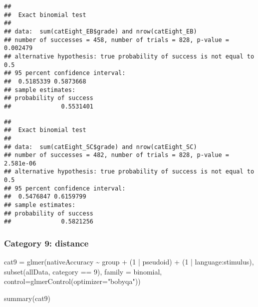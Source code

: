\documentclass[
]{article}
\newenvironment{Shaded}{\begin{snugshade}}{\end{snugshade}}
\newcommand{\AttributeTok}[1]{\textcolor[rgb]{0.77,0.63,0.00}{#1}}
\newcommand{\DecValTok}[1]{\textcolor[rgb]{0.00,0.00,0.81}{#1}}
\newcommand{\FunctionTok}[1]{\textcolor[rgb]{0.00,0.00,0.00}{#1}}
\newcommand{\NormalTok}[1]{#1}
\newcommand{\OtherTok}[1]{\textcolor[rgb]{0.56,0.35,0.01}{#1}}
\newcommand{\SpecialCharTok}[1]{\textcolor[rgb]{0.00,0.00,0.00}{#1}}
\newcommand{\StringTok}[1]{\textcolor[rgb]{0.31,0.60,0.02}{#1}}
\begin{document}
\begin{verbatim}
## 
##  Exact binomial test
## 
## data:  sum(catEight_EB$grade) and nrow(catEight_EB)
## number of successes = 458, number of trials = 828, p-value = 0.002479
## alternative hypothesis: true probability of success is not equal to 0.5
## 95 percent confidence interval:
##  0.5185339 0.5873668
## sample estimates:
## probability of success 
##              0.5531401
\end{verbatim}

\begin{Shaded}
\end{Shaded}

\begin{verbatim}
## 
##  Exact binomial test
## 
## data:  sum(catEight_SC$grade) and nrow(catEight_SC)
## number of successes = 482, number of trials = 828, p-value = 2.581e-06
## alternative hypothesis: true probability of success is not equal to 0.5
## 95 percent confidence interval:
##  0.5476847 0.6159799
## sample estimates:
## probability of success 
##              0.5821256
\end{verbatim}

\hypertarget{category-9-distance}{%
\subsubsection{Category 9: distance}\label{category-9-distance}}

\begin{Shaded}
\begin{Highlighting}[]
\NormalTok{cat9 }\OtherTok{=} \FunctionTok{glmer}\NormalTok{(nativeAccuracy }\SpecialCharTok{\textasciitilde{}}\NormalTok{ group }\SpecialCharTok{+}
\NormalTok{        (}\DecValTok{1} \SpecialCharTok{|}\NormalTok{ pseudoid) }\SpecialCharTok{+}\NormalTok{ (}\DecValTok{1} \SpecialCharTok{|}\NormalTok{ language}\SpecialCharTok{:}\NormalTok{stimulus),}
      \FunctionTok{subset}\NormalTok{(allData, category }\SpecialCharTok{==} \DecValTok{9}\NormalTok{),}
      \AttributeTok{family =}\NormalTok{ binomial,}
      \AttributeTok{control=}\FunctionTok{glmerControl}\NormalTok{(}\AttributeTok{optimizer=}\StringTok{"bobyqa"}\NormalTok{))}

\FunctionTok{summary}\NormalTok{(cat9)}
\end{Highlighting}
\end{Shaded}
\end{document}
